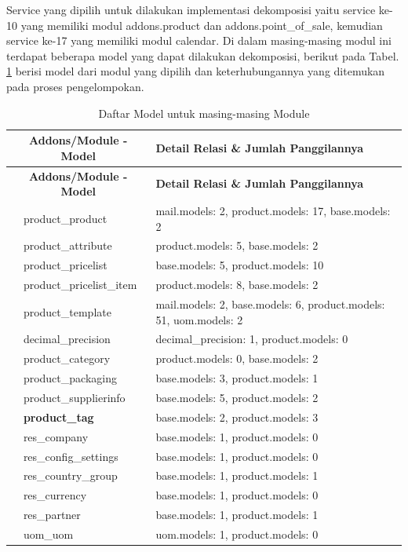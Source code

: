 \endgroup

Service yang dipilih untuk dilakukan implementasi dekomposisi yaitu  service ke-10  yang memiliki modul addons.product dan addons.point{\_}of{\_}sale,  kemudian service ke-17 yang memiliki modul calendar. Di dalam masing-masing modul ini terdapat beberapa model yang dapat dilakukan dekomposisi, berikut pada Tabel. \ref{tab:detail_model} berisi model dari modul yang dipilih dan keterhubungannya yang ditemukan pada proses pengelompokan.

\begin{longtable}{|c|p{4cm}|p{7cm}|}
	\caption{Daftar Model untuk masing-masing Module}
	\label{tab:detail_model}\\
	\hline
	\multicolumn{2}{|c|}{\textbf{Addons/Module - Model}} &  \textbf{Detail Relasi \& Jumlah Panggilannya}\\
	\hline
	\endfirsthead
	\hline
	\multicolumn{2}{|c|}{\textbf{Addons/Module - Model}} & \textbf{Detail Relasi \& Jumlah Panggilannya}\\
	\hline
	\endhead
	\hline
	\endfoot
	\hline
	\endlastfoot

	\multirow{16}{*}{\textbf{product.models}} &  product{\_}product &  mail.models: 2, product.models: 17, base.models: 2 \\ \cline{2-3}  &  product{\_}attribute &  product.models: 5, base.models: 2 \\ \cline{2-3}  &  product{\_}pricelist &  base.models: 5, product.models: 10 \\ \cline{2-3}  &  product{\_}pricelist{\_}item &  product.models: 8, base.models: 2 \\ \cline{2-3}  &  product{\_}template &  mail.models: 2, base.models: 6, product.models: 51, uom.models: 2 \\ \cline{2-3}  &  decimal{\_}precision &  decimal{\_}precision: 1, product.models: 0 \\ \cline{2-3}  &  product{\_}category &  product.models: 0, base.models: 2 \\ \cline{2-3}  &  product{\_}packaging &  base.models: 3, product.models: 1 \\ \cline{2-3}  &  product{\_}supplierinfo &  base.models: 5, product.models: 2 \\ \cline{2-3}  &  \textbf{product{\_}tag} &  base.models: 2, product.models: 3 \\ \cline{2-3}  &  res{\_}company &  base.models: 1, product.models: 0 \\ \cline{2-3}  &  res{\_}config{\_}settings &  base.models: 1, product.models: 0 \\ \cline{2-3}  &  res{\_}country{\_}group &  base.models: 1, product.models: 1 \\ \cline{2-3}  &  res{\_}currency &  base.models: 1, product.models: 0 \\ \cline{2-3}  &  res{\_}partner &  base.models: 1, product.models: 1 \\ \cline{2-3}  &  uom{\_}uom &  uom.models: 1, product.models: 0 \\


\end{longtable}
